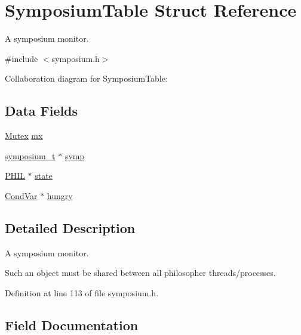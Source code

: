 \hypertarget{structSymposiumTable}{}\section{Symposium\+Table Struct Reference}
\label{structSymposiumTable}


A symposium monitor.  




{\ttfamily \#include $<$symposium.\+h$>$}



Collaboration diagram for Symposium\+Table\+:
\subsection*{Data Fields}
\begin{DoxyCompactItemize}
\item 
\hyperlink{group__syscalls_gaef2ec62cae8e0031fd19fc8b91083ade}{Mutex} \hyperlink{structSymposiumTable_a8c36f26f523e6b2f99f6e70fff098de8}{mx}
\item 
\hyperlink{structsymposium__t}{symposium\+\_\+t} $\ast$ \hyperlink{structSymposiumTable_a4089e2778ba23eb79c4785eb5702f70f}{symp}
\item 
\hyperlink{symposium_8h_a9fced5fb7d50a8fa2e8ae45b0cae3520}{P\+H\+IL} $\ast$ \hyperlink{structSymposiumTable_a70507f28df670d0db2e59fc65309af08}{state}
\item 
\hyperlink{structCondVar}{Cond\+Var} $\ast$ \hyperlink{structSymposiumTable_a6daa1fdbfe8e836e72bfd6953bc91f6e}{hungry}
\end{DoxyCompactItemize}


\subsection{Detailed Description}
A symposium monitor. 

Such an object must be shared between all philosopher threads/processes. 

Definition at line 113 of file symposium.\+h.



\subsection{Field Documentation}
\mbox{\label{structSymposiumTable_a6daa1fdbfe8e836e72bfd6953bc91f6e}} 
